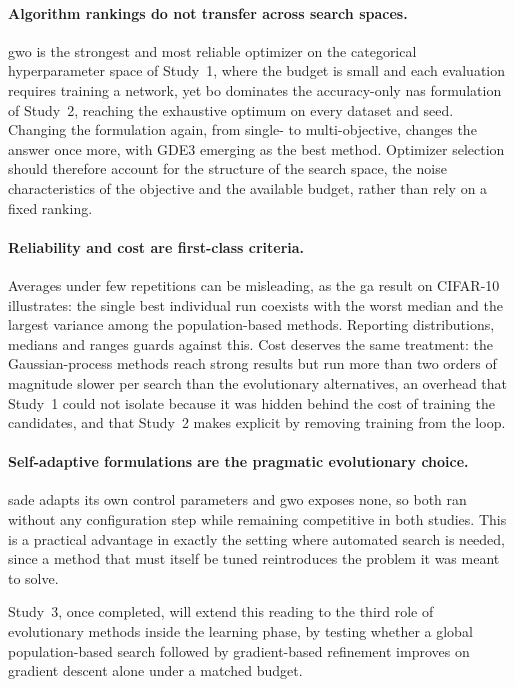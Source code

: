\paragraph{Algorithm rankings do not transfer across search spaces.}
\acrshort{gwo} is the strongest and most reliable optimizer on the categorical hyperparameter space of Study~1, where the budget is small and each evaluation requires training a network, yet \acrshort{bo} dominates the accuracy-only \acrshort{nas} formulation of Study~2, reaching the exhaustive optimum on every dataset and seed. Changing the formulation again, from single- to multi-objective, changes the answer once more, with GDE3 emerging as the best method. Optimizer selection should therefore account for the structure of the search space, the noise characteristics of the objective and the available budget, rather than rely on a fixed ranking.

\paragraph{Reliability and cost are first-class criteria.}
Averages under few repetitions can be misleading, as the \acrshort{ga} result on CIFAR-10 illustrates: the single best individual run coexists with the worst median and the largest variance among the population-based methods. Reporting distributions, medians and ranges guards against this. Cost deserves the same treatment: the Gaussian-process methods reach strong results but run more than two orders of magnitude slower per search than the evolutionary alternatives, an overhead that Study~1 could not isolate because it was hidden behind the cost of training the candidates, and that Study~2 makes explicit by removing training from the loop.

\paragraph{Self-adaptive formulations are the pragmatic evolutionary choice.}
\acrshort{sade} adapts its own control parameters and \acrshort{gwo} exposes none, so both ran without any configuration step while remaining competitive in both studies. This is a practical advantage in exactly the setting where automated search is needed, since a method that must itself be tuned reintroduces the problem it was meant to solve.

Study~3, once completed, will extend this reading to the third role of evolutionary methods inside the learning phase, by testing whether a global population-based search followed by gradient-based refinement improves on gradient descent alone under a matched budget.
